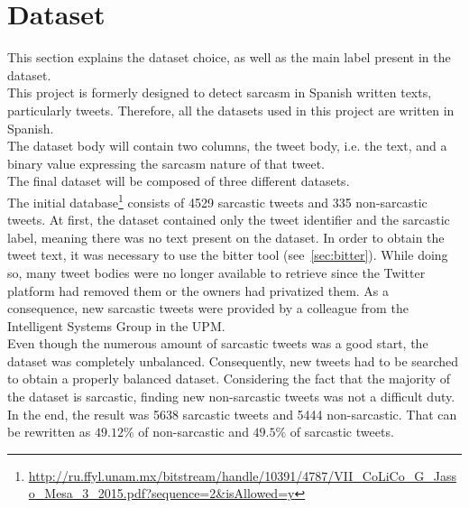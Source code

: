 \section{Dataset}
\label{sec:use-cases}
This section explains the dataset choice, as well as the main label present in the dataset.\\
This project is formerly designed to detect sarcasm in Spanish written texts, particularly tweets. Therefore, all the datasets used in this project are written in Spanish.\\
The dataset body will contain two columns, the tweet body, i.e. the text, and a binary value expressing the sarcasm nature of that tweet.\\
The final dataset will be composed of three different datasets.\\ 
The initial database\footnote{\url{ http://ru.ffyl.unam.mx/bitstream/handle/10391/4787/VII_CoLiCo_G_Jasso_Mesa_3_2015.pdf?sequence=2&isAllowed=y}} consists of 4529 sarcastic tweets and 335 non-sarcastic tweets. At first, the dataset contained only the tweet identifier and the sarcastic label, meaning there was no text present on the dataset. In order to obtain the tweet text, it was necessary to use the bitter tool (see~\cref{sec:bitter}). While doing so, many tweet bodies were no longer available to retrieve since the Twitter platform had removed them or the owners had privatized them. As a consequence, new sarcastic tweets were provided by a colleague from the Intelligent Systems Group in the UPM.\\
Even though the numerous amount of sarcastic tweets was a good start, the dataset was completely unbalanced. Consequently, new tweets had to be searched to obtain a properly balanced dataset. Considering the fact that the majority of the dataset is sarcastic, finding new non-sarcastic tweets was not a difficult duty.\\
In the end, the result was 5638 sarcastic tweets and 5444 non-sarcastic. That can be rewritten as $49.12\%$ of non-sarcastic and $49.5\%$ of sarcastic tweets.\par


